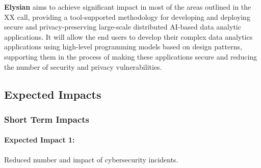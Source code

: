 \documentclass[a4paper,11pt]{article}
\newcommand{\project}[1]{\textbf{#1}\xspace}
\newcommand{\SECURITY}{\project{Elysian}}
\newcommand{\TheProject}{\SECURITY}
\begin{document}



\TheProject{} aims to achieve significant impact in most of the areas outlined in the XX call, providing a tool-supported methodology for developing and deploying secure and privacy-preserving large-scale distributed AI-based data analytic applications. It will allow the end users to develop their complex data analytics applications using high-level programming models based on design patterns, supporting them in the process of making these applications secure and reducing the number of security and privacy vulnerabilities.  

\subsection{Expected Impacts}

\subsubsection{Short Term Impacts}

\begin{mdframed}[backgroundcolor=blue!5]
\paragraph{Expected Impact 1:}
Reduced number and impact of cybersecurity incidents.
\end{mdframed}
\end{document}
